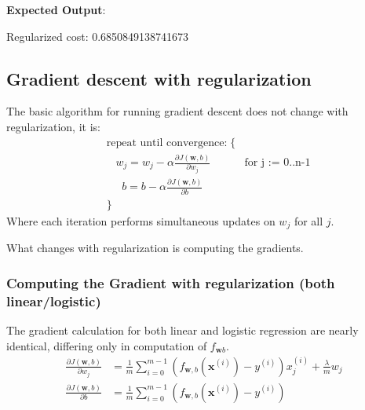 \documentclass[11pt]{article}
\begin{document}
    \textbf{Expected Output}:

Regularized cost: 0.6850849138741673

    \hypertarget{gradient-descent-with-regularization}{%
\subsection{Gradient descent with
regularization}\label{gradient-descent-with-regularization}}

The basic algorithm for running gradient descent does not change with
regularization, it is: \[\begin{align*}
&\text{repeat until convergence:} \; \lbrace \\
&  \; \; \;w_j = w_j -  \alpha \frac{\partial J(\mathbf{w},b)}{\partial w_j} \tag{1}  \; & \text{for j := 0..n-1} \\ 
&  \; \; \;  \; \;b = b -  \alpha \frac{\partial J(\mathbf{w},b)}{\partial b} \\
&\rbrace
\end{align*}\] Where each iteration performs simultaneous updates on
\(w_j\) for all \(j\).

What changes with regularization is computing the gradients.

    \hypertarget{computing-the-gradient-with-regularization-both-linearlogistic}{%
\subsubsection{Computing the Gradient with regularization (both
linear/logistic)}\label{computing-the-gradient-with-regularization-both-linearlogistic}}

The gradient calculation for both linear and logistic regression are
nearly identical, differing only in computation of \(f_{\mathbf{w}b}\).
\[\begin{align*}
\frac{\partial J(\mathbf{w},b)}{\partial w_j}  &= \frac{1}{m} \sum\limits_{i = 0}^{m-1} (f_{\mathbf{w},b}(\mathbf{x}^{(i)}) - y^{(i)})x_{j}^{(i)}  +  \frac{\lambda}{m} w_j \tag{2} \\
\frac{\partial J(\mathbf{w},b)}{\partial b}  &= \frac{1}{m} \sum\limits_{i = 0}^{m-1} (f_{\mathbf{w},b}(\mathbf{x}^{(i)}) - y^{(i)}) \tag{3} 
\end{align*}\]
\end{document}
